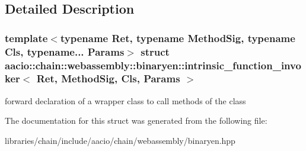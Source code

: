 \subsection{Detailed Description}
\subsubsection*{template$<$typename Ret, typename Method\+Sig, typename Cls, typename... Params$>$\newline
struct aacio\+::chain\+::webassembly\+::binaryen\+::intrinsic\+\_\+function\+\_\+invoker$<$ Ret, Method\+Sig, Cls, Params $>$}

forward declaration of a wrapper class to call methods of the class 

The documentation for this struct was generated from the following file\+:\begin{DoxyCompactItemize}
\item 
libraries/chain/include/aacio/chain/webassembly/binaryen.\+hpp\end{DoxyCompactItemize}

